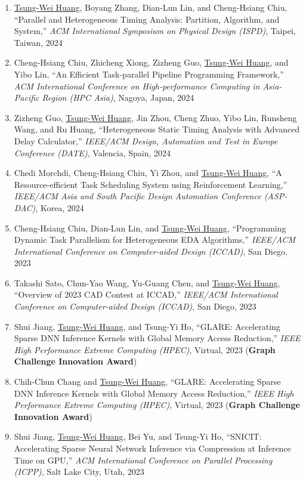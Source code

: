 \documentclass[A4,11pt]{article}
\begin{document}
\begin{enumerate}
    \item \underline{Tsung-Wei Huang}, Boyang Zhang, Dian-Lun Lin, and Cheng-Hsiang Chiu, ``Parallel and Heterogeneous Timing Analysis: Partition, Algorithm, and System,'' \textit{ACM International Symposium on Physical Design (ISPD)}, Taipei, Taiwan, 2024
    \item Cheng-Hsiang Chiu, Zhicheng Xiong, Zizheng Guo, \underline{Tsung-Wei Huang}, and Yibo Lin, ``An Efficient Task-parallel Pipeline Programming Framework,'' \textit{ACM International Conference on High-performance Computing in Asia-Pacific Region (HPC Asia)}, Nagoya, Japan, 2024
    \item Zizheng Guo, \underline{Tsung-Wei Huang}, Jin Zhou, Cheng Zhuo, Yibo Lin, Runsheng Wang, and Ru Huang, ``Heterogeneous Static Timing Analysis with Advanced Delay Calculator,'' \textit{IEEE/ACM Design, Automation and Test in Europe Conference (DATE)}, Valencia, Spain, 2024
    \item Chedi Morchdi, Cheng-Hsiang Chiu, Yi Zhou, and \underline{Tsung-Wei Huang}, ``A Resource-efficient Task Scheduling System using Reinforcement Learning,'' \textit{IEEE/ACM Asia and South Pacific Design Automation Conference (ASP-DAC)}, Korea, 2024
    \item Cheng-Hsiang Chiu, Dian-Lun Lin, and \underline{Tsung-Wei Huang}, ``Programming Dynamic Task Parallelism for Heterogeneous EDA Algorithms,'' \textit{IEEE/ACM International Conference on Computer-aided Design (ICCAD)}, San Diego, 2023
    \item Takashi Sato, Chun-Yao Wang, Yu-Guang Chen, and \underline{Tsung-Wei Huang}, ``Overview of 2023 CAD Contest at ICCAD,'' \textit{IEEE/ACM International Conference on Computer-aided Design (ICCAD)}, San Diego, 2023
    \item Shui Jiang, \underline{Tsung-Wei Huang}, and Tsung-Yi Ho, ``GLARE: Accelerating Sparse DNN Inference Kernels with Global Memory Access Reduction,'' \textit{IEEE High Performance Extreme Computing (HPEC)}, Virtual, 2023 (\textbf{Graph Challenge Innovation Award})
    \item Chih-Chun Chang and \underline{Tsung-Wei Huang}, ``GLARE: Accelerating Sparse DNN Inference Kernels with Global Memory Access Reduction,'' \textit{IEEE High Performance Extreme Computing (HPEC)}, Virtual, 2023 (\textbf{Graph Challenge Innovation Award})
    \item Shui Jiang, \underline{Tsung-Wei Huang}, Bei Yu, and Tsung-Yi Ho, ``SNICIT: Accelerating Sparse Neural Network Inference via Compression at Inference Time on GPU,'' \textit{ACM International Conference on Parallel Processing (ICPP)}, Salt Lake City, Utah, 2023

\end{enumerate}
\end{document}
